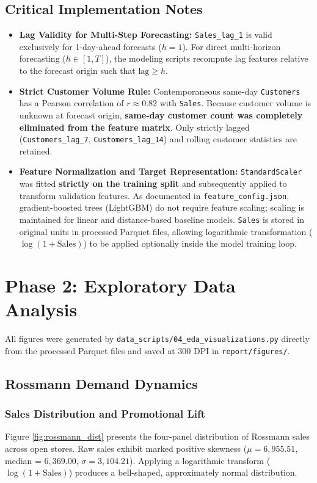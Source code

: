 \documentclass[11pt,a4paper]{article}
\begin{document}
\subsection{Critical Implementation Notes}
\begin{itemize}
    \item \textbf{Lag Validity for Multi-Step Forecasting:} \texttt{Sales\_lag\_1} is valid exclusively for 1-day-ahead forecasts ($h=1$). For direct multi-horizon forecasting ($h \in [1, T]$), the modeling scripts recompute lag features relative to the forecast origin such that $\text{lag} \ge h$.
    \item \textbf{Strict Customer Volume Rule:} Contemporaneous same-day \texttt{Customers} has a Pearson correlation of $r \approx 0.82$ with \texttt{Sales}. Because customer volume is unknown at forecast origin, \textbf{same-day customer count was completely eliminated from the feature matrix}. Only strictly lagged (\texttt{Customers\_lag\_7}, \texttt{Customers\_lag\_14}) and rolling customer statistics are retained.
    \item \textbf{Feature Normalization and Target Representation:} \texttt{StandardScaler} was fitted \textbf{strictly on the training split} and subsequently applied to transform validation features. As documented in \texttt{feature\_config.json}, gradient-boosted trees (LightGBM) do not require feature scaling; scaling is maintained for linear and distance-based baseline models. \texttt{Sales} is stored in original units in processed Parquet files, allowing logarithmic transformation ($\log(1 + \text{Sales})$) to be applied optionally inside the model training loop.
\end{itemize}

\FloatBarrier
\newpage

\section{Phase 2: Exploratory Data Analysis}

All figures were generated by \texttt{data\_scripts/04\_eda\_visualizations.py} directly from the processed Parquet files and saved at 300 DPI in \texttt{report/figures/}.

\subsection{Rossmann Demand Dynamics}

\subsubsection{Sales Distribution and Promotional Lift}
Figure \ref{fig:rossmann_dist} presents the four-panel distribution of Rossmann sales across open stores. Raw sales exhibit marked positive skewness ($\mu = 6,955.51$, median = $6,369.00$, $\sigma = 3,104.21$). Applying a logarithmic transform ($\log(1 + \text{Sales})$) produces a bell-shaped, approximately normal distribution.
\end{document}
